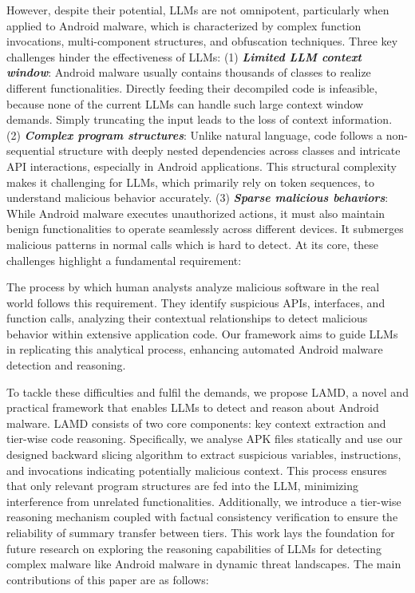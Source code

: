 However, despite their potential, LLMs are not omnipotent, particularly when applied to Android malware, which is characterized by complex function invocations, multi-component structures, and obfuscation techniques. Three key challenges hinder the effectiveness of LLMs: (1) \textit{\textbf{Limited LLM context window}}: Android malware usually contains thousands of classes to realize different functionalities. Directly feeding their decompiled code is infeasible, because none of the current LLMs can handle such large context window demands. Simply truncating the input leads to the loss of context information. (2) \textit{\textbf{Complex program structures}}: Unlike natural language, code follows a non-sequential structure with deeply nested dependencies across classes and intricate API interactions, especially in Android applications. This structural complexity makes it challenging for LLMs, which primarily rely on token sequences, to understand malicious behavior accurately. (3) \textit{\textbf{Sparse malicious behaviors}}: While Android malware executes unauthorized actions, it must also maintain benign functionalities to operate seamlessly across different devices. It submerges malicious patterns in normal calls which is hard to detect. At its core, these challenges highlight a fundamental requirement: 
\begin{center}
\end{center}
The process by which human analysts analyze malicious software in the real world follows this requirement. They identify suspicious APIs, interfaces, and function calls, analyzing their contextual relationships to detect malicious behavior within extensive application code. Our framework aims to guide LLMs in replicating this analytical process, enhancing automated Android malware detection and reasoning.

To tackle these difficulties and fulfil the demands, we propose LAMD, a novel and practical framework that enables LLMs to detect and reason about Android malware. LAMD consists of two core components: key context extraction and tier-wise code reasoning. Specifically, we analyse APK files statically and use our designed backward slicing algorithm to extract suspicious variables, instructions, and invocations indicating potentially malicious context. This process ensures that only relevant program structures are fed into the LLM, minimizing interference from unrelated functionalities. Additionally, we introduce a tier-wise reasoning mechanism coupled with factual consistency verification to ensure the reliability of summary transfer between tiers. This work lays the foundation for future research on exploring the reasoning capabilities of LLMs for detecting complex malware like Android malware in dynamic threat landscapes. The main contributions of this paper are as follows:

